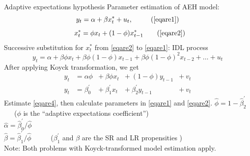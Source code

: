 \documentclass{beamer}
\begin{document}
\begin{frame}{Adaptive expectations hypothesis}
Parameter estimation of AEH model:
\begin{equation}
y_t = \alpha + \beta x_t^\ast + u_t,~~ \tag{\ref{eqare1}}
\end{equation}
\begin{equation}
~~x_t^\ast =  \phi x_t + (1-\phi) x^\ast_{t-1} \tag{\ref{eqare2}}
\end{equation}
Successive substitution for $x_t^\ast$ from \eqref{eqare2} to \eqref{eqare1}: IDL process
\begin{equation}
y_t = \alpha + \beta \phi x_{t} 
    + \beta \phi (1-\phi)x_{t-1} + \beta \phi (1 - \phi)^2 x_{t-2} + \dots + u_t \label{eqare3}
 \end{equation}
After applying Koyck transformation, we get
\begin{equation} \label{eqare4}
\begin{aligned}
y_t &= \alpha \phi &+~ \beta \phi x_{t} &+~ (1-\phi) y_{t-1} &+~ v_t \\
y_t &= \beta_0^{\prime} &+~ \beta_1^{\prime} x_{t} &+~ \beta_2^{\prime} y_{t-1} &+~ v_t
\end{aligned}
\end{equation}
Estimate \eqref{eqare4}, then calculate parameters in \eqref{eqare1} and \eqref{eqare2}.
\smallskip
$\hat{\phi}= 1-\hat{\beta}_2^{\prime}$ ~~~($\phi$ is the ``adaptive expectations coefficient'')\\
\smallskip
$\hat{\alpha} =\hat{\beta}_0^{\prime}/\hat{\phi}$\\
\smallskip
$\hat{\beta} =\hat{\beta}_1^{\prime}/\hat{\phi}$ ~~~~~($\beta_1^{\prime}$ and $\beta$ are the SR and LR propensities )\\
\smallskip
\footnotesize{\qquad Note: Both problems with Koyck-transformed model estimation apply.}
\end{frame}
\end{document}
